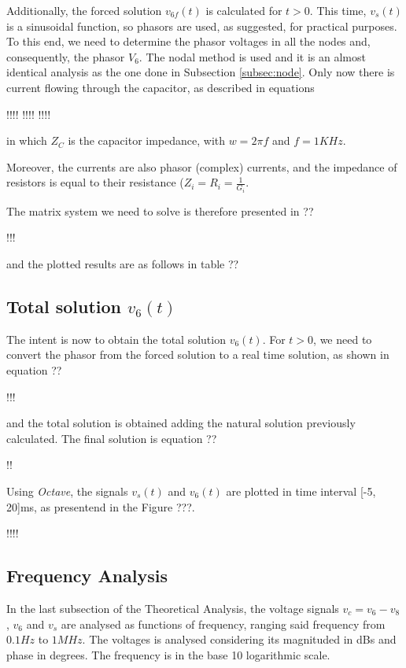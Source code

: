 Additionally, the forced solution $v_{6f}(t)$ is calculated for $t>0$. This time, $v_s(t)$ is a sinusoidal function, so phasors are used, as suggested, for practical purposes. To this end, we need to determine the phasor voltages in all the nodes and, consequently, the phasor $V_6$. The nodal method is used and it is an almost identical analysis as the one done in Subsection \ref{subsec:node}. Only now there is current flowing through the capacitor, as described in equations

!!!!
!!!!
!!!!

in which $Z_C$ is the capacitor impedance, with $w = 2\pi f$ and $f=1 KHz$.


Moreover, the currents are also phasor (complex) currents, and the impedance of resistors is equal to their resistance ($Z_i = R_i = \frac{1}{G_i}$.

The matrix system we need to solve is therefore presented in ??

!!!

and the plotted results are as follows in table ??


\subsection{Total solution $v_{6}(t)$}
\label{subsec:total_theory}

The intent is now to obtain the total solution $v_6(t)$. For $t>0$, we need to convert the phasor from the forced solution to a real time solution, as shown in equation ??

!!!

and the total solution is obtained adding the natural solution previously calculated. The final solution is equation ??

!!

Using \textit{Octave}, the signals $v_s(t)$ and $v_6(t)$ are plotted in time interval [-5, 20]ms, as presentend in the Figure ???.


!!!!

\subsection{Frequency Analysis}
\label{subsec:freq_theory}

In the last subsection of the Theoretical Analysis, the voltage signals $v_c = v_6 - v_8$, $v_6$ and $v_s$ are analysed as functions of frequency, ranging said frequency from $0.1 Hz$ to $1 MHz$. The voltages is analysed considering its magnituded in dBs and phase in degrees. The frequency is in the base 10 logarithmic scale. 


